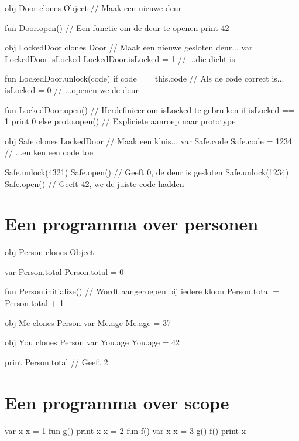 \begin{program}
obj Door clones Object       // Maak een nieuwe deur

fun Door.open()              // Een functie om de deur te openen
    print 42

obj LockedDoor clones Door   // Maak een nieuwe gesloten deur...
var LockedDoor.isLocked
LockedDoor.isLocked = 1      // ...die dicht is

fun LockedDoor.unlock(code)
    if code == this.code     // Als de code correct is...
        isLocked = 0         // ...openen we de deur

fun LockedDoor.open()        // Herdefinieer om isLocked te gebruiken
    if isLocked == 1
        print 0
    else
        proto.open()         // Expliciete aanroep naar prototype

obj Safe clones LockedDoor   // Maak een kluis...
var Safe.code
Safe.code = 1234             // ...en ken een code toe

Safe.unlock(4321)
Safe.open()                  // Geeft 0, de deur is gesloten
Safe.unlock(1234)
Safe.open()                  // Geeft 42, we de juiste code hadden
\end{program}

\section{Een programma over personen}

\begin{program}
obj Person clones Object

var Person.total
Person.total = 0

fun Person.initialize()      // Wordt aangeroepen bij iedere kloon
    Person.total = Person.total + 1

obj Me clones Person
var Me.age
Me.age = 37

obj You clones Person
var You.age
You.age = 42

print Person.total           // Geeft 2
\end{program}

\section{Een programma over scope}

\begin{program}
var x
x = 1
fun g()
    print x
    x = 2
fun f()
    var x
    x = 3
    g()
f()
print x
\end{program}

